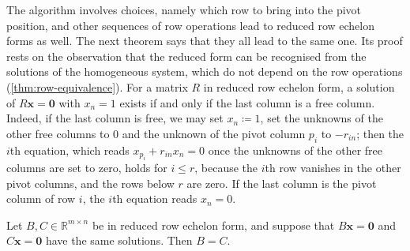 The algorithm involves choices, namely which row to bring into the pivot position, and other sequences of row operations lead to reduced row echelon forms as well. The next theorem says that they all lead to the same one. Its proof rests on the observation that the reduced form can be recognised from the solutions of the homogeneous system, which do not depend on the row operations (\cref{thm:row-equivalence}). For a matrix $R$ in reduced row echelon form, a solution of $R\mathbf x=\mathbf 0$ with $x_n=1$ exists if and only if the last column is a free column. Indeed, if the last column is free, we may set $x_n\coloneqq1$, set the unknowns of the other free columns to $0$ and the unknown of the pivot column $p_i$ to $-r_{in}$; then the $i$th equation, which reads $x_{p_i}+r_{in}x_n=0$ once the unknowns of the other free columns are set to zero, holds for $i\le r$, because the $i$th row vanishes in the other pivot columns, and the rows below $r$ are zero. If the last column is the pivot column of row $i$, the $i$th equation reads $x_n=0$.

\begin{lemma}
\label{lem:rref-null}
Let $B,C\in\mathbb R^{m\times n}$ be in reduced row echelon form, and suppose that $B\mathbf x=\mathbf 0$ and $C\mathbf x=\mathbf 0$ have the same solutions. Then $B=C$.
\end{lemma}

